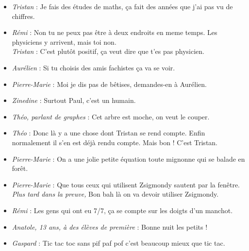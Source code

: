 \setlength{\parindent}{0cm}



\begin{itemize}

\item \textit{Tristan} : \og Je fais des études de maths, ça fait des années que j'ai pas vu de chiffres. \fg

\item \textit{Rémi} : \og Non tu ne peux pas être à deux endroits en meme temps. Les physiciens y arrivent, mais toi non. \fg \\
\textit{Tristan} : \og C'est plutôt positif, ça veut dire que t'es pas physicien. \fg

\item \textit{Aurélien} : \og Si tu choisis des amis fachistes ça va se voir. \fg

\item \textit{Pierre-Marie} : \og Moi je dis pas de bêtises, demandes-en à Aurélien. \fg

\item \textit{Zinedine} : \og Surtout Paul, c'est un humain. \fg

\item \textit{Théo, parlant de graphes} : \og Cet arbre est moche, on veut le couper. \fg

\item \textit{Théo} : \og Donc là y a une chose dont Tristan se rend compte. Enfin normalement il s'en est déjà rendu compte. Mais bon ! C'est Tristan. \fg

\item \textit{Pierre-Marie} : \og On a une jolie petite équation toute mignonne qui se balade en forêt. \fg

\item \textit{Pierre-Marie} : \og Que tous ceux qui utilisent Zsigmondy sautent par la fenêtre. \fg \\
\textit{Plus tard dans la preuve,} Bon bah là on va devoir utiliser Zsigmondy.

\item \textit{Rémi} : \og Les gens qui ont eu 7/7, ça se compte sur les doigts d'un manchot. \fg

\item \textit{Anatole, 13 ans, à des élèves de première} : \og Bonne nuit les petits ! \fg

\item \textit{Gaspard} : \og Tic tac toc sans pif paf pof c'est beaucoup mieux que tic tac. \fg


\end{itemize}
